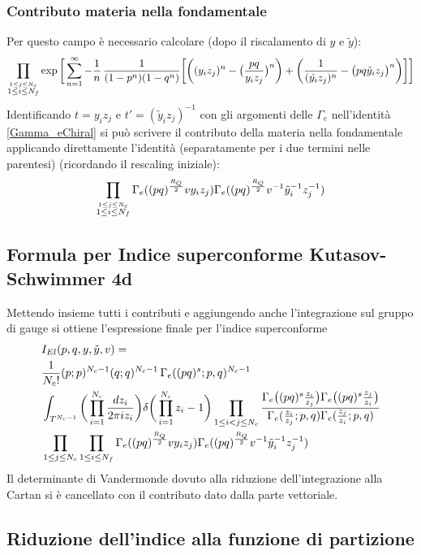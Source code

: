 \documentclass[a4paper,12pt]{article}
\begin{document}
\subsubsection{Contributo materia nella fondamentale}
Per questo campo è necessario calcolare (dopo il riscalamento di $y$ e $\tilde y$):
\begin{align*}
\prod_{\overset{ 1 \leq j \leq N_c}{ 1 \leq i \leq N_f}} \exp \bigg[ \sum_{n=1}^{\infty} - {1 \over n} \, {1 \over (1-p^n)( 1-q^n)}
\bigg[ \bigg( (y_i z_j)^n - \big({ pq \over y_i z_j}\big)^n \bigg) + \bigg( {1 \over  (\tilde{y_i} z_j)^n } - \big( { pq \tilde y_i z_j} \big)^n\bigg) \bigg] \bigg]
\end{align*}
Identificando $ t = y_i z_j$ e $ t' = (\tilde y_i z_j)^{-1}$ con gli argomenti delle $\Gamma_e$ nell'identità \ref{Gamma_eChiral} si può scrivere il contributo della materia nella fondamentale applicando direttamente l'identità (separatamente per i due termini nelle parentesi) (ricordando il rescaling iniziale):
$$
\prod_{\overset{ 1 \leq j \leq N_c}{ 1 \leq i \leq N_f}} \Gamma_e ( (pq)^{R_Q \over 2} v y_i z_j )
\Gamma_e ( (pq)^{R_Q \over 2} v^{-1} {\tilde y_i}^{-1} z_j^{-1})
$$
\subsection{Formula per Indice superconforme Kutasov-Schwimmer 4d}
Mettendo insieme tutti i contributi e aggiungendo anche l'integrazione sul gruppo di gauge si ottiene l'espressione finale per l'indice superconforme
\begin{align*}
&I_{El} ( p,q,y,\tilde y , v) = \\
 & { 1 \over N_c !} (p;p)^{N_c-1} ( q;q)^{N_c-1} \, \Gamma_e( (pq)^s;p,q)^{N_c-1} \\
&\int_{T^{N_c-1}} \bigg( \prod_{i=1}^{N_c } { d z_i \over { 2 \pi i z_i} } \bigg) \delta \bigg( \prod_{i=1}^{N_c} z_i - 1 \bigg)
\prod_{ 1 \leq i < j \leq N_c} \frac{ \Gamma_e \big( (pq)^s {z_i \over z_j} \big) \Gamma_e \big( (pq)^s {z_j \over z_i} \big) }{ \Gamma_e( {z_i \over z_j};p,q) \Gamma_e({z_j \over z_i}; p,q)} \\
& \prod_{ 1 \leq j \leq N_c} \prod_{ 1 \leq i \leq N_f} \Gamma_e ( (pq)^{R_Q \over 2} v y_i z_j )
\Gamma_e ( (pq)^{R_Q \over 2} v^{-1} {\tilde y_i}^{-1} z_j^{-1})
\end{align*}
Il determinante di Vandermonde dovuto alla riduzione dell'integrazione alla Cartan si è cancellato con il contributo dato dalla parte vettoriale.
\subsection{Riduzione dell'indice alla funzione di partizione}
\end{document}
